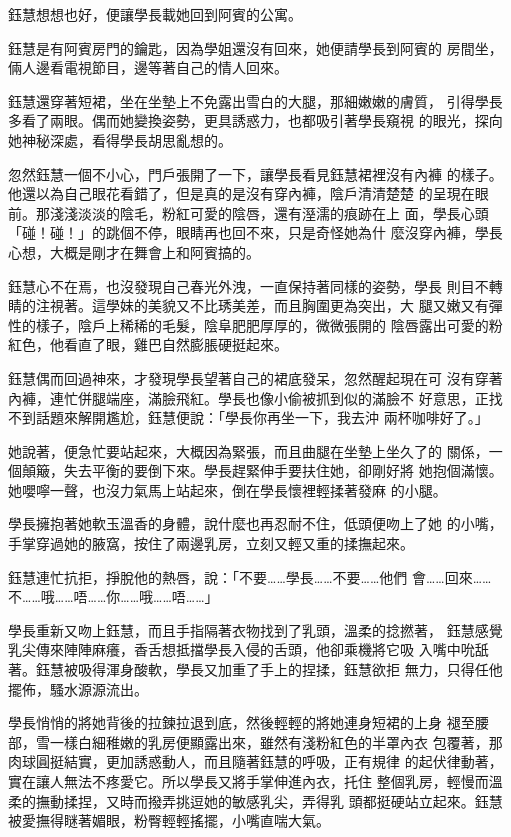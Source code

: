 鈺慧想想也好，便讓學長載她回到阿賓的公寓。

鈺慧是有阿賓房門的鑰匙，因為學姐還沒有回來，她便請學長到阿賓的
房間坐，倆人邊看電視節目，邊等著自己的情人回來。

鈺慧還穿著短裙，坐在坐墊上不免露出雪白的大腿，那細嫩嫩的膚質，
引得學長多看了兩眼。偶而她變換姿勢，更具誘惑力，也都吸引著學長窺視
的眼光，探向她神秘深處，看得學長胡思亂想的。

忽然鈺慧一個不小心，門戶張開了一下，讓學長看見鈺慧裙裡沒有內褲
的樣子。他還以為自己眼花看錯了，但是真的是沒有穿內褲，陰戶清清楚楚
的呈現在眼前。那淺淺淡淡的陰毛，粉紅可愛的陰唇，還有溼濡的痕跡在上
面，學長心頭「碰！碰！」的跳個不停，眼睛再也回不來，只是奇怪她為什
麼沒穿內褲，學長心想，大概是剛才在舞會上和阿賓搞的。

鈺慧心不在焉，也沒發現自己春光外洩，一直保持著同樣的姿勢，學長
則目不轉睛的注視著。這學妹的美貌又不比琇美差，而且胸圍更為突出，大
腿又嫩又有彈性的樣子，陰戶上稀稀的毛髮，陰阜肥肥厚厚的，微微張開的
陰唇露出可愛的粉紅色，他看直了眼，雞巴自然膨脹硬挺起來。

鈺慧偶而回過神來，才發現學長望著自己的裙底發呆，忽然醒起現在可
沒有穿著內褲，連忙併腿端座，滿臉飛紅。學長也像小偷被抓到似的滿臉不
好意思，正找不到話題來解開尷尬，鈺慧便說：「學長你再坐一下，我去沖
兩杯咖啡好了。」

她說著，便急忙要站起來，大概因為緊張，而且曲腿在坐墊上坐久了的
關係，一個顛簸，失去平衡的要倒下來。學長趕緊伸手要扶住她，卻剛好將
她抱個滿懷。她嚶嚀一聲，也沒力氣馬上站起來，倒在學長懷裡輕揉著發麻
的小腿。

學長擁抱著她軟玉溫香的身體，說什麼也再忍耐不住，低頭便吻上了她
的小嘴，手掌穿過她的腋窩，按住了兩邊乳房，立刻又輕又重的揉撫起來。

鈺慧連忙抗拒，掙脫他的熱唇，說：「不要……學長……不要……他們
會……回來……不……哦……唔……你……哦……唔……」

學長重新又吻上鈺慧，而且手指隔著衣物找到了乳頭，溫柔的捻撚著，
鈺慧感覺乳尖傳來陣陣麻癢，香舌想抵擋學長入侵的舌頭，他卻乘機將它吸
入嘴中吮舐著。鈺慧被吸得渾身酸軟，學長又加重了手上的捏揉，鈺慧欲拒
無力，只得任他擺佈，騷水源源流出。

學長悄悄的將她背後的拉鍊拉退到底，然後輕輕的將她連身短裙的上身
褪至腰部，雪一樣白細稚嫩的乳房便顯露出來，雖然有淺粉紅色的半罩內衣
包覆著，那肉球圓挺結實，更加誘惑動人，而且隨著鈺慧的呼吸，正有規律
的起伏律動著，實在讓人無法不疼愛它。所以學長又將手掌伸進內衣，托住
整個乳房，輕慢而溫柔的撫動揉捏，又時而撥弄挑逗她的敏感乳尖，弄得乳
頭都挺硬站立起來。鈺慧被愛撫得瞇著媚眼，粉臀輕輕搖擺，小嘴直喘大氣。

